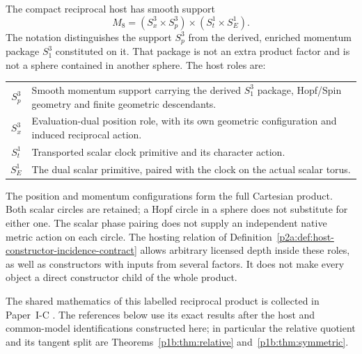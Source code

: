 \documentclass[12pt,a4paper]{article}
\begin{document}
\begin{remark}
\label{p3b:rem:m8-host-construction-chronology}
The compact reciprocal host has smooth support
\[
 M_8=(S_x^3\times S_p^3)\times(S_t^1\times S_E^1).
\]
The notation distinguishes the support \(S_p^3\) from the derived,
enriched momentum package \(S_1^3\) constituted on it.  That package
is not an extra product factor and is not a sphere contained in
another sphere.  The host roles are:
\begin{center}
\begin{tabular}{c|p{}}
 \(S_p^3\) & Smooth momentum support carrying the derived \(S_1^3\)
 package, Hopf/Spin geometry and finite geometric descendants.\\
 \(S_x^3\) & Evaluation-dual position role, with its own geometric
 configuration and induced reciprocal action.\\
 \(S_t^1\) & Transported scalar clock primitive and its character action.\\
 \(S_E^1\) & The dual scalar primitive, paired with the clock on the
 actual scalar torus.
\end{tabular}
\end{center}
The position and momentum configurations form the full Cartesian
product.  Both scalar circles are retained; a Hopf circle in a sphere
does not substitute for either one.  The scalar phase pairing does
not supply an independent native metric action on each circle.
The hosting relation of
Definition~\ref{p2a:def:host-constructor-incidence-contract} allows
arbitrary licensed depth inside these roles, as well as constructors
with inputs from several factors.  It does not make every object a
direct constructor child of the whole product.
\end{remark}

The shared mathematics of this labelled reciprocal product is collected in
Paper~I-C \cite{Kugelmann2026Paper1B}.  The references below use its exact
results after the host and common-model identifications constructed here;
in particular the relative quotient and its tangent split are
Theorems~\ref{p1b:thm:relative} and~\ref{p1b:thm:symmetric}.
\end{document}
